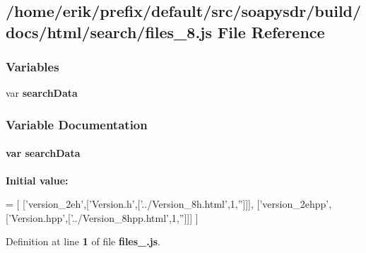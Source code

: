 \subsection{/home/erik/prefix/default/src/soapysdr/build/docs/html/search/files\+\_\+8.js File Reference}
\label{files__8_8js}
\subsubsection*{Variables}
\begin{DoxyCompactItemize}
\item 
var {\bf search\+Data}
\end{DoxyCompactItemize}


\subsubsection{Variable Documentation}
\paragraph[{search\+Data}]{\setlength{\rightskip}{0pt plus 5cm}var search\+Data}\label{files__8_8js_ad01a7523f103d6242ef9b0451861231e}
{\bfseries Initial value\+:}
\begin{DoxyCode}
=
[
  [\textcolor{stringliteral}{'version\_2eh'},[\textcolor{stringliteral}{'Version.h'},[\textcolor{stringliteral}{'../Version\_8h.html'},1,\textcolor{stringliteral}{''}]]],
  [\textcolor{stringliteral}{'version\_2ehpp'},[\textcolor{stringliteral}{'Version.hpp'},[\textcolor{stringliteral}{'../Version\_8hpp.html'},1,\textcolor{stringliteral}{''}]]]
]
\end{DoxyCode}


Definition at line {\bf 1} of file {\bf files\+\_.\+js}.

